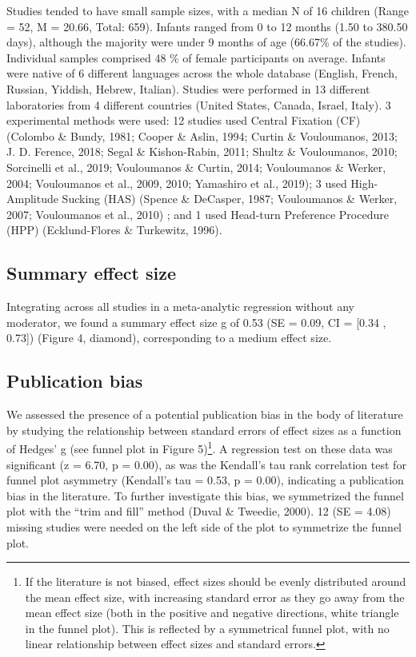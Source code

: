 \documentclass[man,floatsintext]{apa6}
\let\rmarkdownfootnote\footnote%
\def\footnote{\protect\rmarkdownfootnote}
\begin{document}
Studies tended to have small sample sizes, with a median N of 16
children (Range = 52, M = 20.66, Total: 659). Infants ranged from 0 to
12 months (1.50 to 380.50 days), although the majority were under 9
months of age (66.67\% of the studies). Individual samples comprised 48
\% of female participants on average. Infants were native of 6 different
languages across the whole database (English, French, Russian, Yiddish,
Hebrew, Italian). Studies were performed in 13 different laboratories
from 4 different countries (United States, Canada, Israel, Italy). 3
experimental methods were used: 12 studies used Central Fixation (CF)
(Colombo \& Bundy, 1981; Cooper \& Aslin, 1994; Curtin \& Vouloumanos,
2013; J. D. Ference, 2018; Segal \& Kishon-Rabin, 2011; Shultz \&
Vouloumanos, 2010; Sorcinelli et al., 2019; Vouloumanos \& Curtin, 2014;
Vouloumanos \& Werker, 2004; Vouloumanos et al., 2009, 2010; Yamashiro
et al., 2019); 3 used High-Amplitude Sucking (HAS) (Spence \& DeCasper,
1987; Vouloumanos \& Werker, 2007; Vouloumanos et al., 2010) ; and 1
used Head-turn Preference Procedure (HPP) (Ecklund-Flores \& Turkewitz,
1996).

\subsection{Summary effect size}\label{summary-effect-size}

Integrating across all studies in a meta-analytic regression without any
moderator, we found a summary effect size g of 0.53 (SE = 0.09, CI =
{[}0.34 , 0.73{]}) (Figure 4, diamond), corresponding to a medium effect
size.

\subsection{Publication bias}\label{publication-bias}

We assessed the presence of a potential publication bias in the body of
literature by studying the relationship between standard errors of
effect sizes as a function of Hedges' g (see funnel plot in Figure
5)\footnote{If the literature is not biased, effect sizes should be
  evenly distributed around the mean effect size, with increasing
  standard error as they go away from the mean effect size (both in the
  positive and negative directions, white triangle in the funnel plot).
  This is reflected by a symmetrical funnel plot, with no linear
  relationship between effect sizes and standard errors.}. A regression
test on these data was significant (z = 6.70, p = 0.00), as was the
Kendall's tau rank correlation test for funnel plot asymmetry (Kendall's
tau = 0.53, p = 0.00), indicating a publication bias in the literature.
To further investigate this bias, we symmetrized the funnel plot with
the \enquote{trim and fill} method (Duval \& Tweedie, 2000). 12 (SE =
4.08) missing studies were needed on the left side of the plot to
symmetrize the funnel plot.
\end{document}
